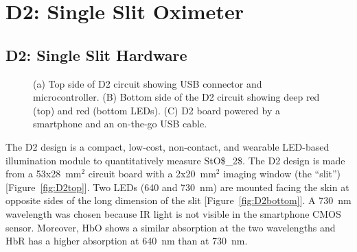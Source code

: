 \section{D2: Single Slit Oximeter}
\subsection{D2: Single Slit Hardware}
\begin{figure}
    \begin{center}
    \end{center}
    \caption{(a) Top side of D2 circuit showing USB connector and microcontroller. (B) Bottom side of the D2 circuit showing deep red (top) and red (bottom LEDs). (C) D2 board powered by a smartphone and an on-the-go USB cable.} 
    \label{fig:D2hardware}
\end{figure} 
The D2 design is a compact, low-cost, non-contact, and wearable \ac{LED}-based illumination module to quantitatively measure \ac{StO$_2$}. The D2 design is made from a 53x28~mm$^2$ circuit board with a 2x20~mm$^2$ imaging window (the ``slit'') [Figure~\ref{fig:D2top}]. Two \ac{LED}s (640 and 730~nm) are mounted facing the skin at opposite sides of the long dimension of the slit [Figure~\ref{fig:D2bottom}]. A 730~nm wavelength was chosen because \ac{IR} light is not visible in the smartphone \ac{CMOS} sensor. Moreover, \ac{HbO} shows a similar absorption at the two wavelengths and \ac{HbR} has a higher absorption at 640~nm than at 730~nm. 

